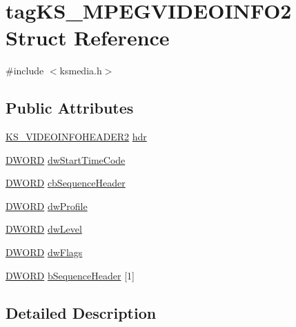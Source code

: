 \hypertarget{structtag_k_s___m_p_e_g_v_i_d_e_o_i_n_f_o2}{}\section{tag\+K\+S\+\_\+\+M\+P\+E\+G\+V\+I\+D\+E\+O\+I\+N\+F\+O2 Struct Reference}
\label{structtag_k_s___m_p_e_g_v_i_d_e_o_i_n_f_o2}


{\ttfamily \#include $<$ksmedia.\+h$>$}

\subsection*{Public Attributes}
\begin{DoxyCompactItemize}
\item 
\hyperlink{ksmedia_8h_a505f5a953699cb697dc04dace56b49d5}{K\+S\+\_\+\+V\+I\+D\+E\+O\+I\+N\+F\+O\+H\+E\+A\+D\+E\+R2} \hyperlink{structtag_k_s___m_p_e_g_v_i_d_e_o_i_n_f_o2_adf8520071bdc29bf15cbbabef55bdaf5}{hdr}
\item 
\hyperlink{mapinls_8h_ad342ac907eb044443153a22f964bf0af}{D\+W\+O\+RD} \hyperlink{structtag_k_s___m_p_e_g_v_i_d_e_o_i_n_f_o2_a32728084569145ba827e21a08a25eb84}{dw\+Start\+Time\+Code}
\item 
\hyperlink{mapinls_8h_ad342ac907eb044443153a22f964bf0af}{D\+W\+O\+RD} \hyperlink{structtag_k_s___m_p_e_g_v_i_d_e_o_i_n_f_o2_ac26274499e25a7a3cd3890681f90cc00}{cb\+Sequence\+Header}
\item 
\hyperlink{mapinls_8h_ad342ac907eb044443153a22f964bf0af}{D\+W\+O\+RD} \hyperlink{structtag_k_s___m_p_e_g_v_i_d_e_o_i_n_f_o2_aa41f40d7e1e0796d103957e92fbc26de}{dw\+Profile}
\item 
\hyperlink{mapinls_8h_ad342ac907eb044443153a22f964bf0af}{D\+W\+O\+RD} \hyperlink{structtag_k_s___m_p_e_g_v_i_d_e_o_i_n_f_o2_a42b7b49604438667f44d02e3571e49d2}{dw\+Level}
\item 
\hyperlink{mapinls_8h_ad342ac907eb044443153a22f964bf0af}{D\+W\+O\+RD} \hyperlink{structtag_k_s___m_p_e_g_v_i_d_e_o_i_n_f_o2_a7dbf6da0b39d4ef7b45d44ed31cbdd66}{dw\+Flags}
\item 
\hyperlink{mapinls_8h_ad342ac907eb044443153a22f964bf0af}{D\+W\+O\+RD} \hyperlink{structtag_k_s___m_p_e_g_v_i_d_e_o_i_n_f_o2_a760421bf03eb26036eaee70fc17ca28c}{b\+Sequence\+Header} \mbox{[}1\mbox{]}
\end{DoxyCompactItemize}


\subsection{Detailed Description}


